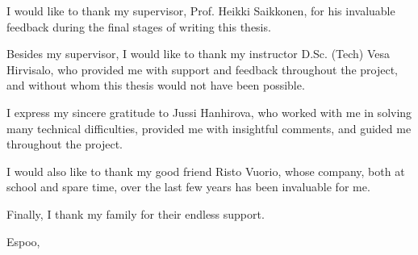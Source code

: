 I would like to thank my supervisor, Prof. Heikki Saikkonen, for his invaluable feedback during the final stages of writing this thesis.

Besides my supervisor, I would like to thank my instructor D.Sc. (Tech) Vesa Hirvisalo, who provided me with support and feedback throughout the project, and without whom this thesis would not have been possible.

I express my sincere gratitude to Jussi Hanhirova, who worked with me in solving many technical difficulties, provided me with insightful comments, and guided me throughout the project.

I would also like to thank my good friend Risto Vuorio, whose company, both at school and spare time, over the last few years has been invaluable for me.

Finally, I thank my family for their endless support.

\vskip 10mm

\noindent Espoo, \DATE
\vskip 5mm
\noindent\AUTHOR

